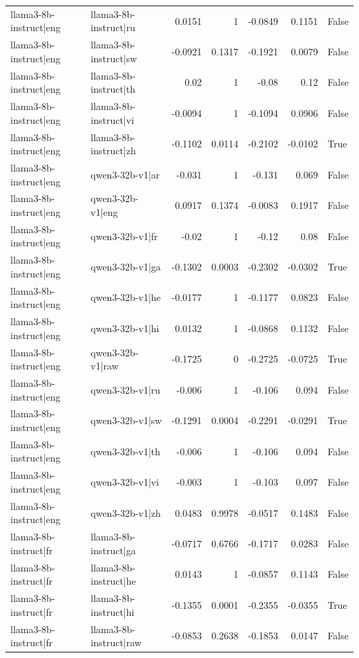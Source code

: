 \begin{table}
\begin{tabular}{l l r r r r l}
llama3-8b-instruct|eng & llama3-8b-instruct|ru & 0.0151 & 1 & -0.0849 & 0.1151 & False \\
llama3-8b-instruct|eng & llama3-8b-instruct|sw & -0.0921 & 0.1317 & -0.1921 & 0.0079 & False \\
llama3-8b-instruct|eng & llama3-8b-instruct|th & 0.02 & 1 & -0.08 & 0.12 & False \\
llama3-8b-instruct|eng & llama3-8b-instruct|vi & -0.0094 & 1 & -0.1094 & 0.0906 & False \\
llama3-8b-instruct|eng & llama3-8b-instruct|zh & -0.1102 & 0.0114 & -0.2102 & -0.0102 & True \\
llama3-8b-instruct|eng & qwen3-32b-v1|ar & -0.031 & 1 & -0.131 & 0.069 & False \\
llama3-8b-instruct|eng & qwen3-32b-v1|eng & 0.0917 & 0.1374 & -0.0083 & 0.1917 & False \\
llama3-8b-instruct|eng & qwen3-32b-v1|fr & -0.02 & 1 & -0.12 & 0.08 & False \\
llama3-8b-instruct|eng & qwen3-32b-v1|ga & -0.1302 & 0.0003 & -0.2302 & -0.0302 & True \\
llama3-8b-instruct|eng & qwen3-32b-v1|he & -0.0177 & 1 & -0.1177 & 0.0823 & False \\
llama3-8b-instruct|eng & qwen3-32b-v1|hi & 0.0132 & 1 & -0.0868 & 0.1132 & False \\
llama3-8b-instruct|eng & qwen3-32b-v1|raw & -0.1725 & 0 & -0.2725 & -0.0725 & True \\
llama3-8b-instruct|eng & qwen3-32b-v1|ru & -0.006 & 1 & -0.106 & 0.094 & False \\
llama3-8b-instruct|eng & qwen3-32b-v1|sw & -0.1291 & 0.0004 & -0.2291 & -0.0291 & True \\
llama3-8b-instruct|eng & qwen3-32b-v1|th & -0.006 & 1 & -0.106 & 0.094 & False \\
llama3-8b-instruct|eng & qwen3-32b-v1|vi & -0.003 & 1 & -0.103 & 0.097 & False \\
llama3-8b-instruct|eng & qwen3-32b-v1|zh & 0.0483 & 0.9978 & -0.0517 & 0.1483 & False \\
llama3-8b-instruct|fr & llama3-8b-instruct|ga & -0.0717 & 0.6766 & -0.1717 & 0.0283 & False \\
llama3-8b-instruct|fr & llama3-8b-instruct|he & 0.0143 & 1 & -0.0857 & 0.1143 & False \\
llama3-8b-instruct|fr & llama3-8b-instruct|hi & -0.1355 & 0.0001 & -0.2355 & -0.0355 & True \\
llama3-8b-instruct|fr & llama3-8b-instruct|raw & -0.0853 & 0.2638 & -0.1853 & 0.0147 & False \\

\end{tabular}
\end{table}
